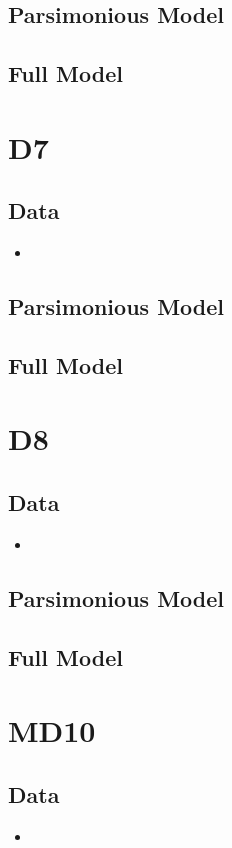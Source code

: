 \documentclass[12pt]{amsart}
\begin{document}
\subsection{Parsimonious Model}

\subsection{Full Model}

\section{D7}
\subsection{Data}
\begin{itemize}
\item
\end{itemize}
\subsection{Parsimonious Model}

\subsection{Full Model}

\section{D8}
\subsection{Data}
\begin{itemize}
\item
\end{itemize}
\subsection{Parsimonious Model}

\subsection{Full Model}

\section{MD10}
\subsection{Data}
\begin{itemize}
\item
\end{itemize}
\end{document}

